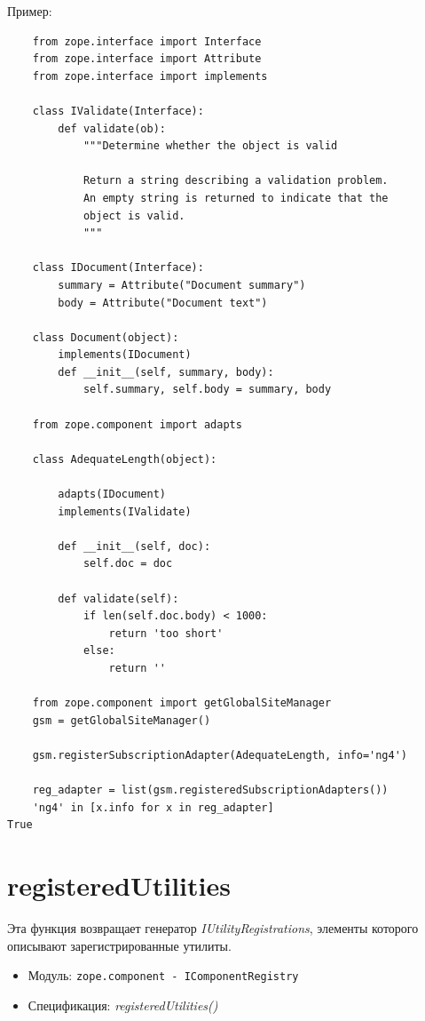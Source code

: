 \documentclass[a4paper,openany,twoside,final]{book}
\providecommand*{\DUroletitlereference}[1]{\textsl{#1}}
\begin{document}
Пример:

\begin{verbatim}
    from zope.interface import Interface
    from zope.interface import Attribute
    from zope.interface import implements

    class IValidate(Interface):
        def validate(ob):
            """Determine whether the object is valid

            Return a string describing a validation problem.
            An empty string is returned to indicate that the
            object is valid.
            """

    class IDocument(Interface):
        summary = Attribute("Document summary")
        body = Attribute("Document text")

    class Document(object):
        implements(IDocument)
        def __init__(self, summary, body):
            self.summary, self.body = summary, body

    from zope.component import adapts

    class AdequateLength(object):

        adapts(IDocument)
        implements(IValidate)

        def __init__(self, doc):
            self.doc = doc

        def validate(self):
            if len(self.doc.body) < 1000:
                return 'too short'
            else:
                return ''

    from zope.component import getGlobalSiteManager
    gsm = getGlobalSiteManager()

    gsm.registerSubscriptionAdapter(AdequateLength, info='ng4')

    reg_adapter = list(gsm.registeredSubscriptionAdapters())
    'ng4' in [x.info for x in reg_adapter]
True
\end{verbatim}


\section*{registeredUtilities%
  \label{registeredutilities}%
}

Эта функция возвращает генератор \DUroletitlereference{IUtilityRegistrations}, элементы которого описывают зарегистрированные утилиты.

\begin{itemize}

\item Модуль: \texttt{zope.component - IComponentRegistry}

\item Спецификация: \DUroletitlereference{registeredUtilities()}

\end{itemize}
\end{document}
